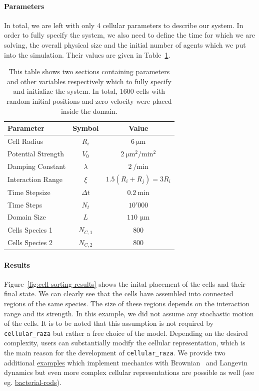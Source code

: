\documentclass[fontsize=11pt,a4paper]{article}
\begin{document}
\paragraph{Parameters}
In total, we are left with only 4 cellular parameters to describe our system.
In order to fully specify the system, we also need to define the time for which we are solving, the
overall physical size and the initial number of agents which we put into the simulation.
Their values  are given in Table~\ref{tab:cell-sorting-parameters}.

\begin{table}
    \centering
    \begin{tabular}{l c c}
        Parameter & Symbol & Value\\
        \hline
        Cell Radius & $R_i$ & $\SI{6}{\micro\metre}$\\
        Potential Strength & $V_0$ & $\SI{2}{\micro\metre^2\per\minute^2}$\\
        Damping Constant & $\lambda$ & $\SI{2}{\per\minute}$\\
        Interaction Range & $\xi$ & $1.5 (R_i+R_j)=3R_i$\\
        \hline
        Time Stepsize & $\Delta t$ & $\SI{0.2}{\minute}$\\
        Time Steps & $N_t$ & $10'000$\\
        Domain Size & $L$ & $110\text{ µm}$\\
        Cells Species 1 & $N_{C,1}$ & $800$\\
        Cells Species 2 & $N_{C,2}$ & $800$\\
    \end{tabular}
    \caption{
        This table shows two sections containing parameters and other variables respectively which
        to fully specify and initialize the system.
        In total, 1600 cells with random initial positions and zero velocity were placed inside the
        domain.
    }
    \label{tab:cell-sorting-parameters}
\end{table}

\paragraph{Results}
Figure~\ref{fig:cell-sorting-results} shows the inital placement of the cells and their final state.
We can clearly see that the cells have assembled into connected regions of the same species.
The size of these regions depends on the interaction range and its strength.
In this example, we did not assume any stochastic motion of the cells.
It is to be noted that this assumption is not required by \texttt{cellular\_raza} but rather a
free choice of the model.
Depending on the desired complexity, users can substantially modify the cellular representation,
which is the main reason for the development of \texttt{cellular\_raza}.
We provide two additional
\href{https://github.com/jonaspleyer/cellular_raza/tree/master/cellular_raza-examples/cell_sorting}{examples}
which implement mechanics with Brownian~\cite{Schlick2002} and
Langevin~\cite{Schlick2002,Pastor1994} dynamics but even more complex cellular representations are
possible as well (see eg. \href{https://cellular-raza.com/showcase/bacterial-rods}{bacterial-rods}).
\end{document}
